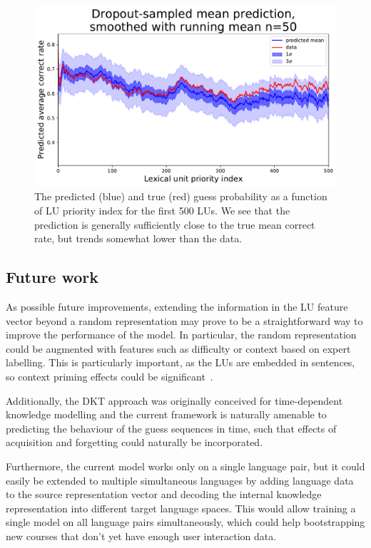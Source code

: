 \begin{figure}[ht]
\centering
\includegraphics[width=1.0\linewidth]{figures/lingvist/uncertainty.pdf}
\caption[The sensitivity estimation of the model using dropout sampling.]{The predicted (blue) and true (red) guess probability as a function of LU priority index for the first 500 LUs. We see that the prediction is generally sufficiently close to the true mean correct rate, but trends somewhat lower than the data.}
\label{fig:uncertainty}
\end{figure}

\subsection{Future work}
As possible future improvements, extending the information in the LU feature vector beyond a random representation may prove to be a straightforward way to improve the performance of the model. In particular, the random representation could be augmented with features such as difficulty or context based on expert labelling. This is particularly important, as the LUs are embedded in sentences, so context priming effects could be significant~\cite{elgort2011deliberate}.

Additionally, the DKT approach was originally conceived for time-dependent knowledge modelling and the current framework is naturally amenable to predicting the behaviour of the guess sequences in time, such that effects of acquisition and forgetting could naturally be incorporated.

Furthermore, the current model works only on a single language pair, but it could easily be extended to multiple simultaneous languages by adding language data to the source representation vector and decoding the internal knowledge representation into different target language spaces. This would allow training a single model on all language pairs simultaneously, which could help bootstrapping new courses that don't yet have enough user interaction data. 

